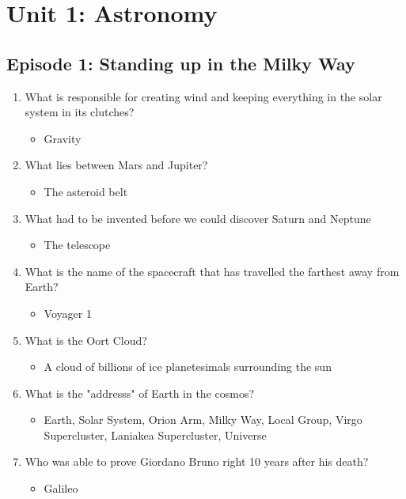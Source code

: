 \chapter{Unit 1: Astronomy}

\section{Episode 1: Standing up in the Milky Way}
\begin{enumerate}
    \item What is responsible for creating wind and keeping everything in the solar system in its clutches?
    \begin{itemize}
        \item Gravity
    \end{itemize}
    \item What lies between Mars and Jupiter?
    \begin{itemize}
        \item The asteroid belt
    \end{itemize}
    \item What had to be invented before we could discover Saturn and Neptune
    \begin{itemize}
        \item The telescope
    \end{itemize}
    \item What is the name of the spacecraft that has travelled the farthest away from Earth?
    \begin{itemize}
        \item Voyager 1
    \end{itemize}
    \item What is the Oort Cloud?
    \begin{itemize}
        \item A cloud of billions of ice planetesimals surrounding the sun 
    \end{itemize}
    \item What is the "addresss" of Earth in the cosmos?
    \begin{itemize}
        \item Earth, Solar System, Orion Arm, Milky Way, Local Group, Virgo Supercluster, Laniakea Supercluster, Universe
    \end{itemize}
    \item Who was able to prove Giordano Bruno right 10 years after his death?
    \begin{itemize}
        \item Galileo
    \end{itemize}
\end{enumerate}

